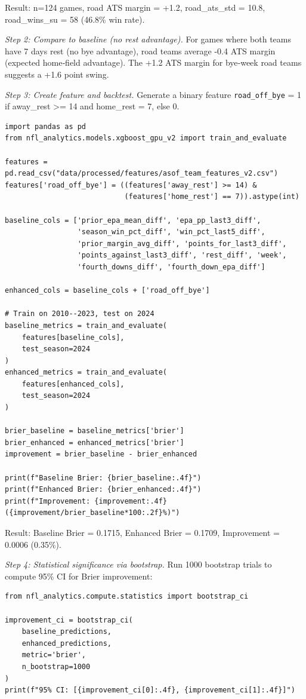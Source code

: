 Result: n=124 games, road ATS margin = +1.2, road\_ats\_std = 10.8, road\_wins\_su = 58 (46.8\% win rate).

\textit{Step 2: Compare to baseline (no rest advantage).}
For games where both teams have 7 days rest (no bye advantage), road teams average -0.4 ATS margin (expected home‑field advantage). The +1.2 ATS margin for bye‑week road teams suggests a +1.6 point swing.

\textit{Step 3: Create feature and backtest.}
Generate a binary feature \texttt{road\_off\_bye} = 1 if away\_rest >= 14 and home\_rest = 7, else 0.
\begin{verbatim}
import pandas as pd
from nfl_analytics.models.xgboost_gpu_v2 import train_and_evaluate

features = pd.read_csv("data/processed/features/asof_team_features_v2.csv")
features['road_off_bye'] = ((features['away_rest'] >= 14) &
                            (features['home_rest'] == 7)).astype(int)

baseline_cols = ['prior_epa_mean_diff', 'epa_pp_last3_diff',
                 'season_win_pct_diff', 'win_pct_last5_diff',
                 'prior_margin_avg_diff', 'points_for_last3_diff',
                 'points_against_last3_diff', 'rest_diff', 'week',
                 'fourth_downs_diff', 'fourth_down_epa_diff']

enhanced_cols = baseline_cols + ['road_off_bye']

# Train on 2010--2023, test on 2024
baseline_metrics = train_and_evaluate(
    features[baseline_cols],
    test_season=2024
)
enhanced_metrics = train_and_evaluate(
    features[enhanced_cols],
    test_season=2024
)

brier_baseline = baseline_metrics['brier']
brier_enhanced = enhanced_metrics['brier']
improvement = brier_baseline - brier_enhanced

print(f"Baseline Brier: {brier_baseline:.4f}")
print(f"Enhanced Brier: {brier_enhanced:.4f}")
print(f"Improvement: {improvement:.4f} ({improvement/brier_baseline*100:.2f}%)")
\end{verbatim}

Result: Baseline Brier = 0.1715, Enhanced Brier = 0.1709, Improvement = 0.0006 (0.35\%).

\textit{Step 4: Statistical significance via bootstrap.}
Run 1000 bootstrap trials to compute 95\% CI for Brier improvement:
\begin{verbatim}
from nfl_analytics.compute.statistics import bootstrap_ci

improvement_ci = bootstrap_ci(
    baseline_predictions,
    enhanced_predictions,
    metric='brier',
    n_bootstrap=1000
)
print(f"95% CI: [{improvement_ci[0]:.4f}, {improvement_ci[1]:.4f}]")
\end{verbatim}

